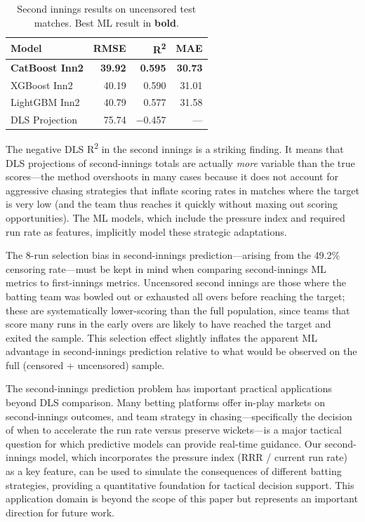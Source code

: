 \documentclass[10pt,a4paper,twocolumn]{article}
\begin{document}
\begin{table}[H]
\centering
\caption{Second innings results on uncensored test matches. Best ML result in \textbf{bold}.}
\label{tab:inn2}
\small
\begin{tabular}{@{}lrrr@{}}
\toprule
\textbf{Model} & \textbf{RMSE} & \textbf{R\textsuperscript{2}} & \textbf{MAE} \\
\midrule
\textbf{CatBoost Inn2}  & \textbf{39.92} & \textbf{0.595} & \textbf{30.73} \\
XGBoost Inn2            & 40.19 & 0.590 & 31.01 \\
LightGBM Inn2           & 40.79 & 0.577 & 31.58 \\
\midrule
DLS Projection          & 75.74 & $-$0.457 & --- \\
\bottomrule
\end{tabular}
\end{table}

The negative DLS R\textsuperscript{2} in the second innings is a striking finding. It means that DLS projections of second-innings totals are actually \emph{more} variable than the true scores---the method overshoots in many cases because it does not account for aggressive chasing strategies that inflate scoring rates in matches where the target is very low (and the team thus reaches it quickly without maxing out scoring opportunities). The ML models, which include the pressure index and required run rate as features, implicitly model these strategic adaptations.

The 8-run selection bias in second-innings prediction---arising from the 49.2\% censoring rate---must be kept in mind when comparing second-innings ML metrics to first-innings metrics. Uncensored second innings are those where the batting team was bowled out or exhausted all overs before reaching the target; these are systematically lower-scoring than the full population, since teams that score many runs in the early overs are likely to have reached the target and exited the sample. This selection effect slightly inflates the apparent ML advantage in second-innings prediction relative to what would be observed on the full (censored + uncensored) sample.

The second-innings prediction problem has important practical applications beyond DLS comparison. Many betting platforms offer in-play markets on second-innings outcomes, and team strategy in chasing---specifically the decision of when to accelerate the run rate versus preserve wickets---is a major tactical question for which predictive models can provide real-time guidance. Our second-innings model, which incorporates the pressure index (RRR / current run rate) as a key feature, can be used to simulate the consequences of different batting strategies, providing a quantitative foundation for tactical decision support. This application domain is beyond the scope of this paper but represents an important direction for future work.
\end{document}
